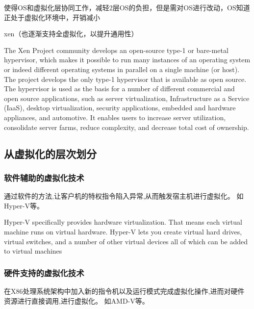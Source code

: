 使得OS和虚拟化层协同工作，减轻2层OS的负担，但是需对OS进行改动，OS知道正处于虚拟化环境中，开销减小

xen（也逐渐支持全虚拟化，以提升通用性）

\begin{definition}[Xen]
    The Xen Project community develops an open-source type-1 or bare-metal hypervisor, which makes it possible to run many instances of an operating system or indeed different operating systems in parallel on a single machine (or host). The project develops the only type-1 hypervisor that is available as open source. The hypervisor is used as the basis for a number of different commercial and open source applications, such as server virtualization, Infrastructure as a Service (IaaS), desktop virtualization, security applications, embedded and hardware appliances, and automotive. It enables users to increase server utilization, consolidate server farms, reduce complexity, and decrease total cost of ownership.
\end{definition}

\subsection{从虚拟化的层次划分}

\subsubsection{软件辅助的虚拟化技术}

\begin{definition}[软件辅助的虚拟化技术]
    通过软件的方法,让客户机的特权指令陷入异常,从而触发宿主机进行虚拟化。 如Hyper-V等。 
\end{definition}

\begin{definition}[Hyper-V]
    Hyper-V specifically provides hardware virtualization. That means each virtual machine runs on virtual hardware. Hyper-V lets you create virtual hard drives, virtual switches, and a number of other virtual devices all of which can be added to virtual machines
\end{definition}

\subsubsection{硬件支持的虚拟化技术}

\begin{definition}[硬件支持的虚拟化技术]
    在X86处理系统架构中加入新的指令机以及运行模式完成虚拟化操作,进而对硬件资源进行直接调用,进行虚拟化。 如AMD-V等。 
\end{definition}

